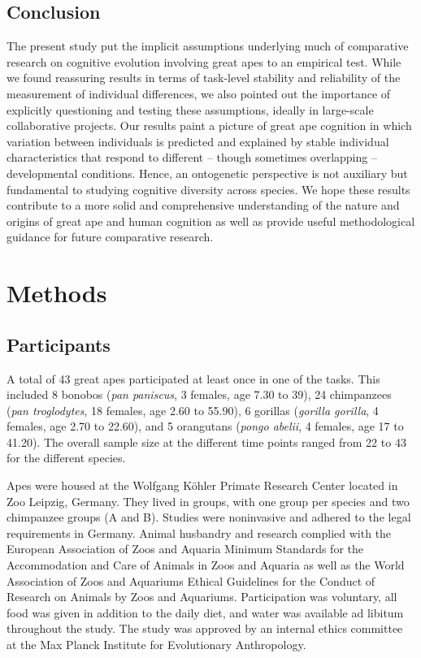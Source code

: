 \documentclass[
  man,floatsintext]{apa6}
\begin{document}
\hypertarget{conclusion}{%
\subsection{Conclusion}\label{conclusion}}

The present study put the implicit assumptions underlying much of comparative research on cognitive evolution involving great apes to an empirical test. While we found reassuring results in terms of task-level stability and reliability of the measurement of individual differences, we also pointed out the importance of explicitly questioning and testing these assumptions, ideally in large-scale collaborative projects. Our results paint a picture of great ape cognition in which variation between individuals is predicted and explained by stable individual characteristics that respond to different -- though sometimes overlapping -- developmental conditions. Hence, an ontogenetic perspective is not auxiliary but fundamental to studying cognitive diversity across species. We hope these results contribute to a more solid and comprehensive understanding of the nature and origins of great ape and human cognition as well as provide useful methodological guidance for future comparative research.

\hypertarget{methods}{%
\section{Methods}\label{methods}}

\hypertarget{participants}{%
\subsection{Participants}\label{participants}}

A total of 43 great apes participated at least once in one of the tasks. This included 8 bonobos (\emph{pan paniscus}, 3 females, age 7.30 to 39), 24 chimpanzees (\emph{pan troglodytes}, 18 females, age 2.60 to 55.90), 6 gorillas (\emph{gorilla gorilla}, 4 females, age 2.70 to 22.60), and 5 orangutans (\emph{pongo abelii}, 4 females, age 17 to 41.20). The overall sample size at the different time points ranged from 22 to 43 for the different species.

Apes were housed at the Wolfgang Köhler Primate Research Center located in Zoo Leipzig, Germany. They lived in groups, with one group per species and two chimpanzee groups (A and B). Studies were noninvasive and adhered to the legal requirements in Germany. Animal husbandry and research complied with the European Association of Zoos and Aquaria Minimum Standards for the Accommodation and Care of Animals in Zoos and Aquaria as well as the World Association of Zoos and Aquariums Ethical Guidelines for the Conduct of Research on Animals by Zoos and Aquariums. Participation was voluntary, all food was given in addition to the daily diet, and water was available ad libitum throughout the study. The study was approved by an internal ethics committee at the Max Planck Institute for Evolutionary Anthropology.
\end{document}
